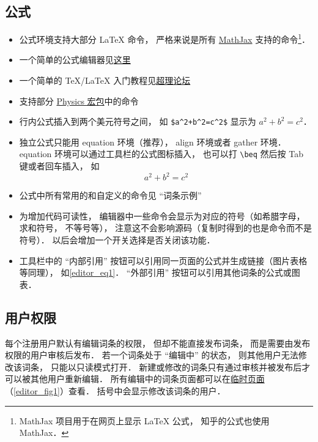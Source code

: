 \subsection{公式}
\begin{itemize}
\item 公式环境支持大部分 LaTeX 命令， 严格来说是所有 \href{https://www.mathjax.org/}{MathJax} 支持的命令\footnote{MathJax 项目用于在网页上显示 LaTeX 公式， 知乎的公式也使用 MathJax．}．
\item 一个简单的公式编辑器见\href{https://www.codecogs.com/latex/eqneditor.php}{这里}
\item 一个简单的 TeX/LaTeX 入门教程见\href{https://chaoli.club/index.php/211}{超理论坛}
\item 支持部分 \href{http://mirrors.ibiblio.org/CTAN/macros/latex/contrib/physics/physics.pdf}{Physics 宏包}中的命令
\item 行内公式插入到两个美元符号之间， 如 \lstinline|$a^2+b^2=c^2$| 显示为 $a^2 + b^2 = c^2$．
\item 独立公式只能用 equation 环境（推荐）， align 环境或者 gather 环境． equation 环境可以通过工具栏的公式图标插入， 也可以打 \lstinline|\beq| 然后按 Tab 键或者回车插入， 如
\begin{equation}\label{editor_eq1}
a^2 + b^2 = c^2
\end{equation}
\item 公式中所有常用的和自定义的命令见 “词条示例”
\item 为增加代码可读性， 编辑器中一些命令会显示为对应的符号（如希腊字母， 求和符号， 不等号等）， 注意这不会影响源码（复制时得到的也是命令而不是符号）． 以后会增加一个开关选择是否关闭该功能．
\item 工具栏中的 “内部引用” 按钮可以引用同一页面的公式并生成链接（图片表格等同理）， 如\autoref{editor_eq1}． “外部引用” 按钮可以引用其他词条的公式或图表．
\end{itemize}

\subsection{用户权限}
每个注册用户默认有编辑词条的权限， 但却不能直接发布词条， 而是需要由发布权限的用户审核后发布． 若一个词条处于 “编辑中” 的状态， 则其他用户无法修改该词条， 只能以只读模式打开． 新建或修改的词条只有通过审核并被发布后才可以被其他用户重新编辑． 所有编辑中的词条页面都可以在\href{http://wuli.wiki/changed/changed.html}{临时页面}（\autoref{editor_fig1}）查看． 括号中会显示修改该词条的用户．

